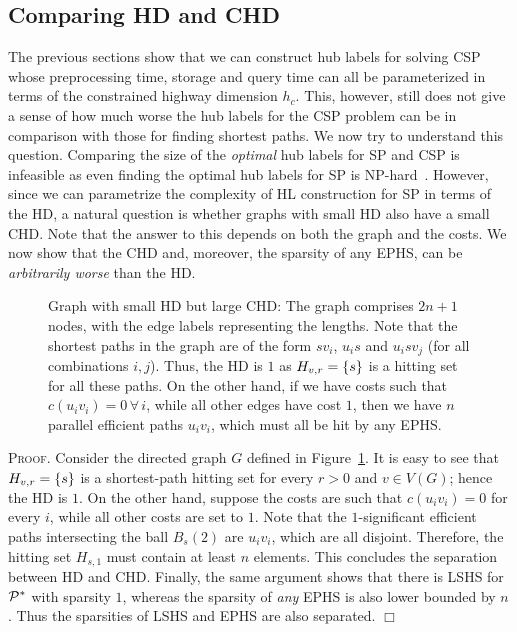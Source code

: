 \documentclass[opre,nonblindrev]{informs3} %
\renewenvironment{proof}[1][\textsc{Proof.}]{#1 }{\hfill $\Box$}
\begin{document}
\subsection{Comparing HD and CHD}
\label{ssec:hdvschd}
The previous sections show that we can construct hub labels for solving CSP whose preprocessing time, storage and query time can all be parameterized in terms of the constrained highway dimension $h_c$. 
This, however, still does not give a sense of how much worse the hub labels for the CSP problem can be in comparison with those for finding shortest paths. 
We now try to understand this question.
Comparing the size of the \emph{optimal} hub labels for SP and CSP is infeasible as even finding the optimal hub labels for SP is NP-hard~\cite{babenko_hl_complexity}. 
However, since we can parametrize the complexity of HL construction for SP in terms of the HD, a natural question is whether graphs with small HD also have a small CHD. 
Note that the answer to this depends on both the graph and the costs.
We now show that the CHD and, moreover, the sparsity of any EPHS, can be \emph{arbitrarily worse} than the HD. 
\begin{figure}

\caption{Graph with small HD but large CHD: The graph comprises $2n+1$ nodes, with the edge labels representing the lengths. Note that the shortest paths in the graph are of the form $sv_i$, $u_is$ and $u_isv_j$ (for all combinations $i,j$). Thus, the HD is $1$ as $H_{v,r}=\{s\}$ is a hitting set for all these paths. On the other hand, if we have costs such that $c(u_iv_i)=0\,\forall\,i$, while all other edges have cost $1$, then we have $n$ parallel efficient paths $u_iv_i$, which must all be hit by any EPHS.}
\label{fig:big_chd}
\end{figure}
\begin{proof}
Consider the directed graph $G$ defined in Figure~\ref{fig:big_chd}.
It is easy to see that $H_{v,r}=\{s\}$ is a shortest-path hitting set for every $r>0$ and $v\in V(G)$; hence the HD is $1$.
On the other hand, suppose the costs are such that $c(u_iv_i)=0$ for every $i$, while all other costs are set to $1$.
Note that the $1$-significant efficient paths intersecting the ball $B_s(2)$ are $u_iv_i$, which are all disjoint.
Therefore, the hitting set $H_{s,1}$ must contain at least $n$ elements. 
This concludes the separation between HD and CHD.
Finally, the same argument shows that there is LSHS for $\mathcal{P}^*$ with sparsity $1$, whereas the sparsity of \emph{any} EPHS is also lower bounded by $n$.
Thus the sparsities of LSHS and EPHS are also separated. 
\end{proof}
\end{document}
